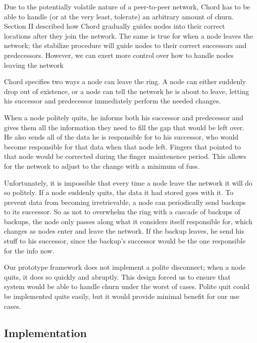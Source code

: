 \documentclass[10pt, conference, compsocconf]{IEEEtran}
\begin{document}
Due to the potentially volatile nature of a peer-to-peer network, Chord has to be able to handle (or at the very least, tolerate) an arbitrary amount of churn.  Section II described how Chord gradually guides nodes into their correct locations after they join the network.  The same is true for when a node leaves the network; the stabilize procedure will guide nodes to their correct successors and predecessors.  However, we can exert more control over how to handle nodes leaving the network

Chord specifies two ways a node can leave the ring.  A node can either suddenly drop out of existence, or a node can tell the network he is about to leave, letting his successor and predecessor immediately perform the needed changes.

When a node politely quits, he informs both his successor and predecessor and gives them all the information they need to fill the gap that would be left over. He also sends all of the data he is responsible for to his successor, who would become responsible for that data when that node left.  Fingers that pointed to that node would be corrected during the finger maintenence period.  This allows for the network to adjust to the change with a minimum of fuss.

Unfortunately, it is impossible that every time a node leave the network it will do so politely.  If a node suddenly quits, the data it had stored goes with it. To prevent data from becoming irretrievable, a node can periodically send backups to its successor.  So as not to overwhelm the ring with a cascade of backups of backups, the node only passes along what it considers itself responsible for, which changes as nodes enter and leave the network.  If the backup leaves, he send his stuff to his successor, since the backup's successor would be the one responsible for the info now. 

Our prototype framework does not implement a polite disconnect;  when a node quits, it does so quickly and abruptly.  This design forced us to ensure that system would be able to handle churn under the worst of cases.  Polite quit could be implemented quite easily, but it would provide minimal benefit for our use cases. 


\subsection{Implementation}
\end{document}
